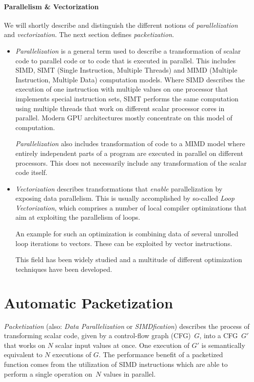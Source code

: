 \paragraph{Parallelism \& Vectorization}
We will shortly describe and distinguish the different notions of \emph{parallelization} and \emph{vectorization}.
The next section defines \emph{packetization}.
\begin{itemize}
    \item
        \emph{Parallelization} is a general term used to describe a transformation of scalar code to parallel code or to code that is executed in parallel.
        This includes SIMD, SIMT (Single Instruction, Multiple Threads) and MIMD (Multiple Instruction, Multiple Data) computation models.
        Where SIMD describes the execution of one instruction with multiple values on one processor that implements special instruction sets, SIMT performs the same computation using multiple threads that work on different scalar processor cores in parallel.
        Modern GPU architectures mostly concentrate on this model of computation. %

        \emph{Parallelization} also includes transformation of code to a MIMD model where entirely independent parts of a program are executed in parallel on different processors.
        This does not necessarily include any transformation of the scalar code itself.

    \item
        \emph{Vectorization} describes transformations that \emph{enable} parallelization by exposing data parallelism.
        This is usually accomplished by so-called \emph{Loop Vectorization}, which comprises a number of local compiler optimizations that aim at exploiting the parallelism of loops.

        An example for such an optimization is combining data of several unrolled loop iterations to vectors.
        These can be exploited by vector instructions.

        This field has been widely studied and a multitude of different optimization techniques have been developed.
\end{itemize}


\section{Automatic Packetization}
\label{sec:introduction:automaticpacketization}
\emph{Packetization} (also: \emph{Data Parallelization} or \emph{SIMDfication}) describes the process of transforming scalar code, given by a control-flow graph (CFG)~$G$, into a CFG~$G'$ that works on $N$ scalar input values at once.
One execution of $G'$ is semantically equivalent to $N$ executions of $G$.
The performance benefit of a packetized function comes from the utilization of SIMD instructions which are able to perform a single operation on~$N$ values in parallel.

